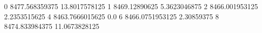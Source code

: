 0 8477.568359375 13.8017578125
1 8469.12890625 5.3623046875
2 8466.001953125 2.2353515625
4 8463.7666015625 0.0
6 8466.0751953125 2.30859375
8 8474.833984375 11.0673828125
